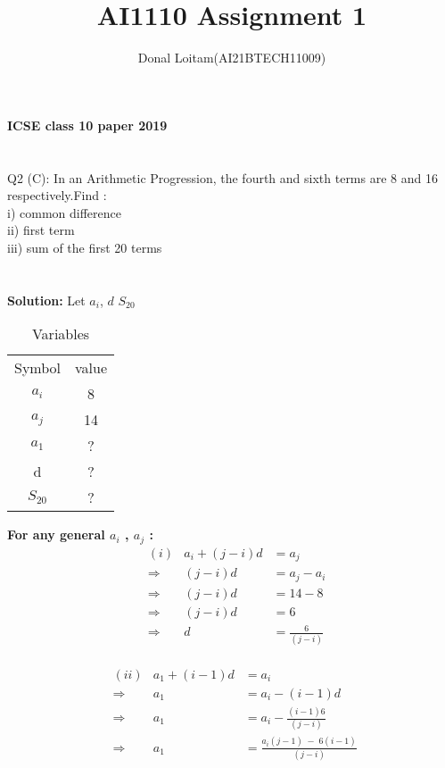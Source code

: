 \documentclass[journal, 12pt, twocolumn]{IEEEtran}
\title{AI1110 Assignment 1}
\author{Donal Loitam(AI21BTECH11009)}
\begin{document}
    \maketitle

    \textbf{\large{ICSE class 10 paper 2019}}\\
    \\
    \\
    {Q2 (C):
    In an Arithmetic Progression, the fourth and sixth terms are 8 and 16 respectively.Find :\\
 i) common difference\\
 ii) first term\\
 iii) sum of the first 20 terms}\\\\\\
    \textbf{\large{Solution:}}
    Let $a_i$, 
 \(d\) 
$S_{20}$\\

\begin{table}[h!]
\caption{Variables}
    \centering
    \begin{tabular}{|c|c|}
        \hline
        Symbol & value \\
         $ a_i $  &  8 \\
         $ a_j  $ &  14 \\
         $ a_1 $ &  ?  \\
          d    &  ?  \\
       $S_{20}$  &  ?  \\
          \hline
    \end{tabular}
\end{table}
    


\textbf{For any general $a_i$ , $a_j$ :}\\
\begin{align*}
        &(i)&a_i + (j-i)d &= a_j\\
        &\Rightarrow & (j-i)d &= a_j - a_i\\
        &\Rightarrow & (j-i)d &= 14 - 8\\
        &\Rightarrow & (j-i)d &= 6\\
        &\Rightarrow & d  &= \tfrac{6}{(j-i)} \\
    \end{align*}
    
     \begin{align*}
        &(ii)&a_1 + (i-1)d &= a_i\\
        &\Rightarrow & a_1 &= a_i - (i-1)d\\
        &\Rightarrow & a_1 &=  a_i - \tfrac{(i-1)6}{(j-i)} \;\;\;\\ 
        &\Rightarrow & a_1 &=  \tfrac{a_i(j-1)\;-\;6(i-1)}{(j-i)} \; 
    \end{align*}
    
\end{document}
